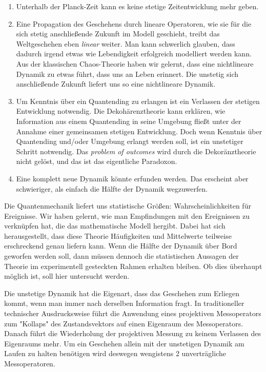 \documentclass[12pt]{article}
\begin{document}
\begin{enumerate}
    \item Unterhalb der Planck-Zeit kann es keine stetige Zeitentwicklung mehr geben.
    \item Eine Propagation des Geschehens durch lineare Operatoren, wie sie für die sich stetig anschließende Zukunft im Modell geschieht, treibt das Weltgeschehen eben \emph{linear} weiter. Man kann schwerlich glauben, dass dadurch irgend etwas wie Lebendigkeit erfolgreich modelliert werden kann. Aus der klassischen Chaos-Theorie haben wir gelernt, dass eine nichtlineare Dynamik zu etwas führt, dass uns an Leben erinnert. Die unstetig sich anschließende Zukunft liefert uns so eine nichtlineare Dynamik.
    \item Um Kenntnis über ein Quantending zu erlangen ist ein Verlassen der stetigen Entwicklung notwendig. Die Dekohärenztheorie kann erklären, wie Information aus einem Quantending in seine Umgebung fließt unter der Annahme einer gemeinsamen stetigen Entwicklung. Doch wenn Kenntnis über Quantending und/oder Umgebung erlangt werden soll, ist ein unstetiger Schritt notwendig. Das \emph{problem of outcomes} wird durch die Dekoränztheorie nicht gelöst, und das ist das eigentliche Paradoxon.
    \item Eine komplett neue Dynamik könnte erfunden werden. Das erscheint aber schwieriger, als einfach die Hälfte der Dynamik wegzuwerfen.
\end{enumerate}
Die Quantenmechanik liefert uns statistische Größen: Wahrscheinlichkeiten für Ereignisse. Wir haben gelernt, wie man Empfindungen mit den Ereignissen zu verknüpfen hat, die das mathematische Modell hergibt. Dabei hat sich herausgestellt, dass diese Theorie Häufigkeiten und Mittelwerte teilweise erschreckend genau liefern kann. Wenn die Hälfte der Dynamik über Bord geworfen werden soll, dann müssen dennoch die statistischen Aussagen der Theorie im experimentell gesteckten Rahmen erhalten bleiben. Ob dies überhaupt möglich ist, soll hier untersucht werden. 

Die unstetige Dynamik hat die Eigenart, dass das Geschehen zum Erliegen kommt, wenn man immer nach derselben Information fragt. In traditioneller technischer Ausdrucksweise führt die Anwendung eines projektiven Messoperators zum "Kollaps" des Zustandsvektors auf einen Eigenraum des Messoperators. Danach führt die Wiederholung der projektiven Messung zu keinem Verlassen des Eigenraums mehr. Um ein Geschehen allein mit der unstetigen Dynamik am Laufen zu halten benötigen wird deswegen wengistens 2 unverträgliche Messoperatoren.
\end{document}
